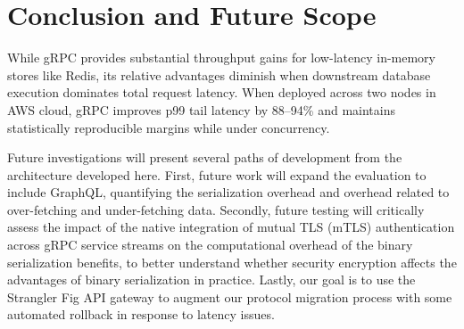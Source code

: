 \documentclass[conference]{IEEEtran}
\begin{document}
\section{Conclusion and Future Scope}

While gRPC provides substantial throughput gains for low-latency in-memory stores like Redis, its relative advantages diminish when downstream database execution dominates total request latency. When deployed across two nodes in AWS cloud, gRPC improves p99 tail latency by 88--94\% and maintains statistically reproducible margins while under concurrency.

Future investigations will present several paths of development from the architecture developed here. First, future work will expand the evaluation to include GraphQL, quantifying the serialization overhead and overhead related to over-fetching and under-fetching data. Secondly, future testing will critically assess the impact of the native integration of mutual TLS (mTLS) authentication across gRPC service streams on the computational overhead of the binary serialization benefits, to better understand whether security encryption affects the advantages of binary serialization in practice. Lastly, our goal is to use the Strangler Fig API gateway to augment our protocol migration process with some automated rollback in response to latency issues.
\end{document}
